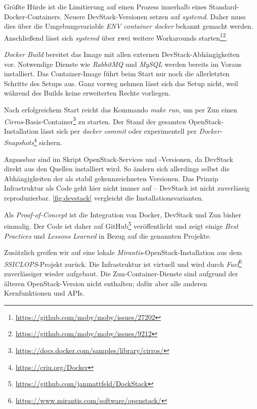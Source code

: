 \noindent Größte Hürde ist die Limitierung auf einen Prozess innerhalb eines Standard-Docker-Containers. Neuere DevStack-Versionen setzen auf \emph{systemd}. Daher muss dies über die Umgebungsvariable \emph{ENV container docker} bekannt gemacht werden. Anschließend lässt sich \emph{systemd} über zwei weitere Workarounds starten\footnote{\url{https://github.com/moby/moby/issues/27202}}\footnote{\url{https://github.com/moby/moby/issues/9212}}.

\emph{Docker Build} bereitet das Image mit allen externen DevStack-Abhängigkeiten vor. Notwendige Dienste wie \emph{RabbitMQ} und \emph{MySQL} werden bereits im Voraus installiert. Das Container-Image führt beim Start nur noch die allerletzten Schritte des Setups aus. Ganz vorweg nehmen lässt sich das Setup nicht, weil während des Builds keine erweiterten Rechte vorliegen.

Nach erfolgreichem Start reicht das Kommando \emph{make run}, um per Zun einen \emph{Cirros}-Basis-Container\footnote{\url{https://docs.docker.com/samples/library/cirros/}} zu starten. Der Stand der gesamten OpenStack-Installation lässt sich per \emph{docker commit} oder experimentell per \emph{Docker-Snapshots}\footnote{\url{https://criu.org/Docker}} sichern.

Anpassbar sind im Skript OpenStack-Services und -Versionen, da DevStack direkt aus den Quellen installiert wird. So ändern sich allerdings selbst die Abhängigkeiten der als stabil gekennzeichneten Versionen. Das Prinzip Infrastruktur als Code geht hier nicht immer auf -- DevStack ist nicht zuverlässig reproduzierbar. \autoref{fig:devstack} vergleicht die Installationsvarianten.

Als \emph{Proof-of-Concept} ist die Integration von Docker, DevStack und Zun bisher einmalig. Der Code ist daher auf GitHub\footnote{\url{https://github.com/janmattfeld/DockStack}} veröffentlicht und zeigt einige \emph{Best Practices} und \emph{Lessons Learned} in Bezug auf die genannten Projekte.

Zusätzlich greifen wir auf eine lokale \emph{Mirantis}-OpenStack-Installation aus dem \emph{SSICLOPS}-Projekt zurück. Die Infrastruktur ist virtuell und wird durch \emph{Fuel}\footnote{\url{https://www.mirantis.com/software/openstack/}} zuverlässiger wieder aufgebaut. Die Zun-Container-Dienste sind aufgrund der älteren OpenStack-Version nicht enthalten; dafür aber alle anderen Kernfunktionen und APIs.

